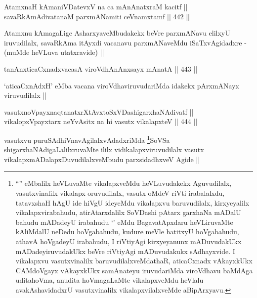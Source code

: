 \begin{shl}
AtamxnaH kAmaniVDatevxV na ca mAnAnatxraM kacitf ||  \\
savaRkAmAdivatanaM parxmANamiti ceVnamxtamf ||  442 ||  
\end{shl}

\begin{artha}
Atamxnu kAmagaLige AsharxyaveMbudakekx beVre parxmANavu elilxyU
iruvudilalx, savaRkAma itAyxdi vacanavu parxmANaveMdu iSaTxvAgidadxre
- (muMde heVLuva utatxravide) || 
\end{artha}

\begin{shl}
tanAnxticaCxnadxvacasA viroVdhAnAnxsayx mAnatA ||  443 || 
\end{shl}

\begin{artha}
`aticaCxnAdxH' eMba vacana viroVdhaviruvudariMda idakekx pArxmANayx
  viruvudilalx ||
\end{artha}


\begin{shl}
vasutxnoV\s payxnaqtanatxrXtAvxtoSxVDashigarxhaNAdivatf || \\
vikalopxV\s payxtarx neYvAsitx na hi vasutx vikalapxteV ||  444 || 
\end{shl}

\begin{artha}
vasutxvu puruSAdhiVnavAgilalxvAdadxriMda \footnote{``\stext'' eMbalilx
  heVLuvaMte vikalapxveMdu heVLuvudakekx Aguvudilalx, vasutxvinalilx
  vikalapx oruvudilalx, vasutx oMdeV riVti irabalalxdu, tatavxshaH
  hAgU ide hiVgU ideyeMdu vikalapxvu baruvudilalx, kirxyeyalilx
  vikalapxvirabahudu, atirAtarxdalilx SoVDashi pAtarx garxhaNa mADalU
  bahudu mADadeyU irabahudu `\stext' eMdu BagavatApxdaru heVLiruvaMte
  kAliMdalU neDedu hoVgabahudu, kudure meVle hatitxyU hoVgabahudu,
  athavA hoVgadeyU irabahudu, I riVtiyAgi kirxyeyanunx mADuvudakUkx
  mADadeyiruvudakUkx beVre riVtiyAgi mADuvudakukx sAdhayxvide. I
  vikalapxvu vasutxvinalilx baruvudilalxveMdathaR, aticaCxnadx
  vAkayxkUkx CAMdoVgayx vAkayxkUkx samAnateyu iruvudariMda viroVdhavu
  baMdAga uditahoVma, anudita hoVmagaLaMte vikalapxveMdu heVlalu
  avakAshavidadxrU vasutxvinalilx vikalapxvilalxveMde aBipArxyavu.}SoVSa
shigarxhaNAdigaLalilxruvaMte ililx vidikalapxviruvudilalx vasutx
vikalapxmADalapxDuvudilalxveMbudu parxsidadhxveV Agide ||
\end{artha}



